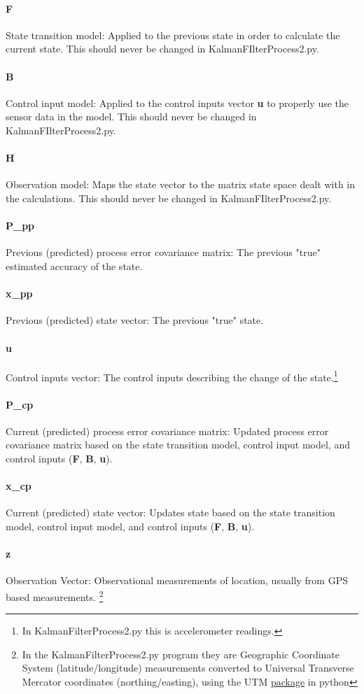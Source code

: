 \documentclass{article}
\begin{document}
\paragraph{F}
State transition model: Applied to the previous state in order to calculate the current state. This should never be changed in KalmanFIlterProcess2.py.
\paragraph{B}
Control input model: Applied to the control inputs vector \textbf{u} to properly use the sensor data in the model. This should never be changed in KalmanFIlterProcess2.py.
\paragraph{H}
Observation model: Maps the state vector to the matrix state space dealt with in the calculations. This should never be changed in KalmanFIlterProcess2.py.
\paragraph{P\_pp}
Previous (predicted) process error covariance matrix: The previous "true" estimated accuracy of the state. 
\paragraph{x\_pp}
Previous (predicted) state vector: The previous "true" state.
\paragraph{u}
Control inputs vector: The control inputs describing the change of the state.\footnote{In KalmanFilterProcess2.py this is accelerometer readings.}
\paragraph{P\_cp}
Current (predicted) process error covariance matrix: Updated process error covariance matrix based on the state transition model, control input model, and control inputs (\textbf{F}, \textbf{B}, \textbf{u}).
\paragraph{x\_cp}
Current (predicted) state vector: Updates state  based on the state transition model, control input model, and control inputs (\textbf{F}, \textbf{B}, \textbf{u}).
\paragraph{z}
Observation Vector: Observational measurements of location, usually from GPS based measurements. \footnote{In the KalmanFilterProcess2.py program they are Geographic Coordinate System (latitude/longitude) measurements converted to Universal Transverse Mercator coordinates (northing/easting), using the UTM \href{https://pypi.org/project/utm/}{package} in python  }  
\end{document}
